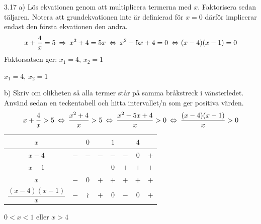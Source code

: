 \begin{task}{3.17 a)}
	Lös ekvationen genom att multiplicera termerna med $x$. Faktorisera sedan täljaren. Notera att grundekvationen inte är definierad för $x=0$ därför implicerar endast den första ekvationen den andra.
	\[x+\dfrac{4}{x}=5 \ra
	x^2+4=5x \lra
	x^2-5x+4=0 \lra
	(x-4)(x-1)=0\]
	Faktorsatsen ger: $x_1=4$, $x_2=1$
	
	\ans $x_1=4$, $x_2=1$
\end{task}

\begin{task}{b)}
	Skriv om olikheten så alla termer står på samma bråkstreck i vänsterledet. Använd sedan en teckentabell och hitta intervallet/n som ger positiva värden.
	\[x+\dfrac{4}{x}>5 \lra
	\dfrac{x^2+4}{x}>5 \lra
	\dfrac{x^2-5x+4}{x}>0 \lra
	\dfrac{(x-4)(x-1)}{x}>0\]
	\begin{tabular}{c|c|c|c|c|c|c|c}
		$x$                      &     & $0$ &     & $1$ &     & $4$ &     \\ \hline
		$x-4$                    & $-$ & $-$ & $-$ & $-$ & $-$ & $0$ & $+$ \\
		$x-1$                    & $-$ & $-$ & $-$ & $0$ & $+$ & $+$ & $+$ \\
		$x$                      & $-$ & $0$ & $+$ & $+$ & $+$ & $+$ & $+$ \\ \hline
		$\dfrac{(x-4)(x-1)}{x}$  & $-$ &$\wr$& $+$ & $0$ & $-$ & $0$ & $+$ \\
	\end{tabular}
	
	\ans $0<x<1$ eller $x>4$
\end{task}
